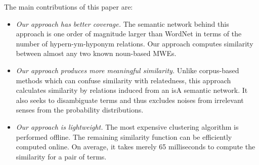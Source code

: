 

The main contributions of this paper are:
\begin{itemize}
\item {\em Our approach has better coverage.}
The semantic network behind this approach is one order of magnitude larger
than WordNet in terms of the number of hypern-ym-hyponym relations.
Our approach computes similarity between almost any two
known noun-based MWEs.

\item {\em Our approach produces more meaningful similarity.}
Unlike corpus-based methods which can confuse similarity with relatedness,
this approach calculates similarity by relations induced from an isA semantic
network. It also seeks to disambiguate terms
and thus excludes noises from irrelevant senses from
the probability distributions.

\item {\em Our approach is lightweight.}  The most expensive
  clustering algorithm is performed offline.
  The remaining similarity function can be efficiently
  computed online. On average, it takes merely 65 milliseconds to
  compute the similarity for a pair of terms.
\end{itemize}

